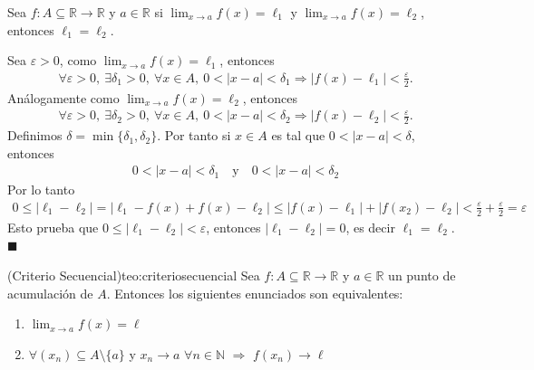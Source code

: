 \documentclass[12pt]{book}
\renewenvironment{proof}[1][\textit{Demostración}]{%
  \par\noindent{\bfseries #1.}\enspace}{\hfill$\blacksquare$\par}
\begin{document}
\begin{teo}{}{}
    Sea $f : A \subseteq \mathbb{R} \longrightarrow \mathbb{R}$ y $a \in \mathbb{R}$ si $\displaystyle \lim_{x \to a} f(x)=\ell _1$ y  $\displaystyle \lim_{x \to a} f(x)=\ell _2$, entonces $\ell_1 = \ell_2 $.
\end{teo}
\begin{proof}
    Sea $\varepsilon>0$, como $\displaystyle \lim_{x \to a} f(x)=\ell _1$, entonces
    \begin{align*}
        \forall \varepsilon>0, \ \exists \delta_1 >0, \ \forall x \in A, \ 0<|x-a|<\delta_1 \Longrightarrow |f(x)-\ell_1| < \frac{\varepsilon}{2}.
    \end{align*}
    Análogamente como $\displaystyle \lim_{x \to a} f(x)=\ell _2$, entonces
    \begin{align*}
        \forall \varepsilon>0, \ \exists \delta_2 >0, \ \forall x \in A, \ 0<|x-a|<\delta_2 \Longrightarrow |f(x)-\ell_2| < \frac{\varepsilon}{2}.
    \end{align*}
    Definimos $\delta = \min\{ \delta_1 , \delta_2\}$. Por tanto si $x\in A$ es tal que $0<|x-a|<\delta$, entonces
    \begin{align*}
        0<|x-a|<\delta_1 \quad \text{y} \quad 0<|x-a|<\delta_2 
    \end{align*}
    Por lo tanto 
    \begin{align*}
        0\leq |\ell_1 - \ell_2| = |\ell _1 - f(x)+f(x)-\ell _2 | \leq |f(x)-\ell_1 | +|f(x_2)-\ell_2 | < \frac{\varepsilon}{2}+ \frac{\varepsilon}{2}= \varepsilon
    \end{align*}
    Esto prueba que $0\leq |\ell_1 - \ell_2|< \varepsilon$, entonces $|\ell_1 - \ell_2| = 0 $, es decir $\ell_1 = \ell_2$.
\end{proof}

\begin{teo}{(Criterio Secuencial)}{teo:criteriosecuencial}
    Sea $f : A \subseteq  \mathbb{R} \longrightarrow \mathbb{R}$ y $a \in \mathbb{R}$ un punto de acumulación de $A$. Entonces los siguientes enunciados son equivalentes:
    \begin{enumerate}
        \item $\displaystyle \lim_{x \to a} f(x)= \ell$ 
        \item $ \forall (x_n) \subseteq A\setminus \{a\}$ y $x_n \to a $ $\forall n \in \mathbb{N}$ $\Longrightarrow$ $f(x_n) \to \ell$
    \end{enumerate}
\end{teo}
\end{document}
